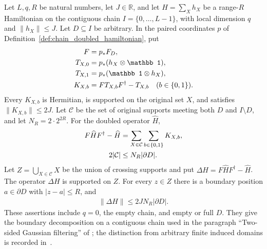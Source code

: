 \begin{lemma}
    \label{thm:chain_partial_swap_boundary}
    \leanok
    Let $L,q,R$ be natural numbers, let $J\in\mathbb R$, and let
    $H=\sum_Xh_X$ be a range-$R$ Hamiltonian on the contiguous chain
    $I=\{0,\ldots,L-1\}$, with local dimension $q$ and
    $\|h_X\|\le J$. Let $D\subseteq I$ be arbitrary. In the paired
    coordinates $p$ of Definition~\ref{def:chain_doubled_hamiltonian}, put
    \begin{align}
        F       & =p_*F_D,\notag                                \\
        T_{X,0} & =p_*(h_X\otimes\mathbb 1),\notag              \\
        T_{X,1} & =p_*(\mathbb 1\otimes h_X),\notag             \\
        K_{X,b} & =FT_{X,b}F^\dagger-T_{X,b}\quad(b\in\{0,1\}).
    \end{align}
    Every $K_{X,b}$ is Hermitian, is supported on the original set $X$,
    and satisfies $\|K_{X,b}\|\le2J$. Let $\mathcal C$ be the set of
    original supports meeting both $D$ and $I\setminus D$, and let
    $N_R=2\cdot2^{2R}$. For the doubled operator $\widehat H$,
    \begin{align}
        F\widehat H F^\dagger-\widehat H
                      & =\sum_{X\in\mathcal C}\sum_{b\in\{0,1\}}K_{X,b},\notag \\
        2|\mathcal C| & \le N_R|\partial D|.
    \end{align}
    Let $Z=\bigcup_{X\in\mathcal C}X$ be the union of crossing
    supports and put $\Delta H=F\widehat H F^\dagger-\widehat H$.
    The operator $\Delta H$ is supported on $Z$. For every $z\in Z$ there
    is a boundary position $a\in\partial D$ with $|z-a|\le R$,
    and
    \begin{align}
        \|\Delta H\|\le 2J N_R|\partial D|.
    \end{align}
    These assertions include $q=0$, the empty chain, and empty or full
    $D$. They give the boundary decomposition on a contiguous chain used
    in the paragraph ``Two-sided Gaussian filtering'' of
    \cite{TNLean2026OneDimensional}; the distinction from arbitrary finite
    induced domains is recorded
    in~\cite{gap:tnlean_one_dimensional_connected_domain_scope}.
\end{lemma}
